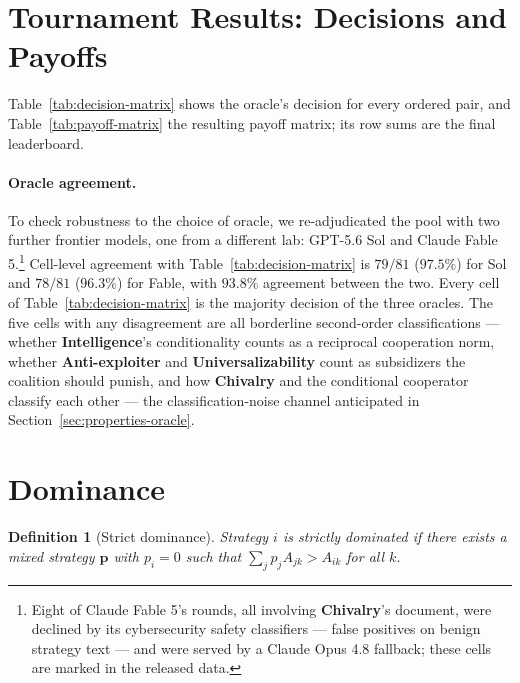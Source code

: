 \documentclass[11pt]{article}
\newtheorem{definition}{Definition}
\begin{document}



\section{Tournament Results: Decisions and Payoffs}
\label{sec:results}



Table~\ref{tab:decision-matrix} shows the oracle's decision for every
ordered pair, and Table~\ref{tab:payoff-matrix} the resulting payoff
matrix; its row sums are the final leaderboard.

\paragraph{Oracle agreement.}
To check robustness to the choice of oracle, we re-adjudicated the
pool with two further frontier models, one from a different lab:
GPT-5.6 Sol and Claude Fable 5.\footnote{Eight of Claude Fable 5's
rounds, all involving \textbf{Chivalry}'s document, were declined by
its cybersecurity safety classifiers --- false positives on benign
strategy text --- and were served by a Claude Opus 4.8 fallback;
these cells are marked in the released data.}
Cell-level agreement with Table~\ref{tab:decision-matrix} is $79/81$
($97.5\%$) for Sol and $78/81$ ($96.3\%$) for Fable, with $93.8\%$
agreement between the two.
Every cell of Table~\ref{tab:decision-matrix} is the majority
decision of the three oracles.
The five cells with any disagreement are all borderline
second-order classifications --- whether \textbf{Intelligence}'s
conditionality counts as a reciprocal cooperation norm, whether
\textbf{Anti-exploiter} and \textbf{Universalizability} count as
subsidizers the coalition should punish, and how \textbf{Chivalry}
and the conditional cooperator classify each other --- the
classification-noise channel anticipated in
Section~\ref{sec:properties-oracle}.


\section{Dominance}
\label{sec:dominance}

\begin{definition}[Strict dominance]
Strategy $i$ is \emph{strictly dominated} if there exists a mixed
strategy $\mathbf{p}$ with $p_i = 0$ such that
$\sum_j p_j A_{jk} > A_{ik}$ for all $k$.
\end{definition}
\end{document}
